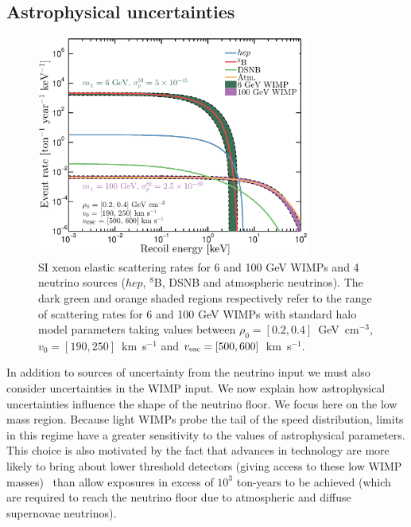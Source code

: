 \subsection{Astrophysical uncertainties}\label{sec:nufloor_astro}
\begin{figure}
\begin{center}
\includegraphics[trim = 0mm 0 0mm 0mm, clip, width=0.8\textwidth,angle=0]{Figures/EventRates_with_uncertainties.eps}
\caption[Effect of astrophysical uncertainties on WIMP recoil spectra]{SI xenon elastic scattering rates for 6 and 100 GeV WIMPs and 4 neutrino sources ($hep$, $^8$B, DSNB and atmospheric neutrinos). The dark green and orange shaded regions respectively refer to the range of scattering rates for 6 and 100 GeV WIMPs with standard halo model parameters taking values between $\rho_0 = [0.2,0.4]$~GeV~cm$^{-3}$, $v_0 = [190,250]$~km~s$^{-1}$ and $v_{\rm esc} = [500,600]$~km~s$^{-1}$.}
\label{fig:EventRates_with_uncertainties}
\end{center}
\end{figure} 
In addition to sources of uncertainty from the neutrino input we must also consider uncertainties in the WIMP input. We now explain how astrophysical uncertainties influence the shape of the neutrino floor. We focus here on the low mass region. Because light WIMPs probe the tail of the speed distribution, limits in this regime have a greater sensitivity to the values of astrophysical parameters. This choice is also motivated by the fact that advances in technology are more likely to bring about lower threshold detectors (giving access to these low WIMP masses)~\cite{Mirabolfathi:2015pha,Kadribasic:2017obi} than allow exposures in excess of $10^3$ ton-years to be achieved (which are required to reach the neutrino floor due to atmospheric and diffuse supernovae neutrinos).

